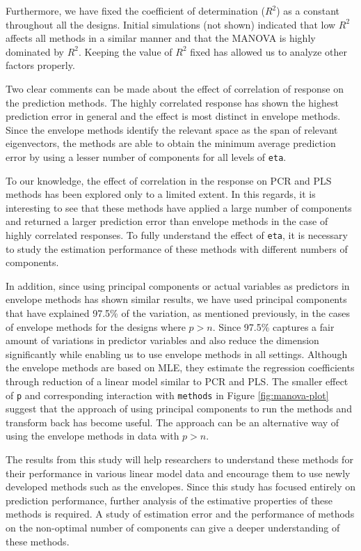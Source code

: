 \documentclass[review]{elsarticle}
\begin{document}
Furthermore, we have fixed the coefficient of determination (\(R^2\)) as a constant throughout all the designs. Initial simulations (not shown) indicated that low \(R^2\) affects all methods in a similar manner and that the MANOVA is highly dominated by \(R^2\). Keeping the value of \(R^2\) fixed has allowed us to analyze other factors properly.

Two clear comments can be made about the effect of correlation of response on the prediction methods. The highly correlated response has shown the highest prediction error in general and the effect is most distinct in envelope methods. Since the envelope methods identify the relevant space as the span of relevant eigenvectors, the methods are able to obtain the minimum average prediction error by using a lesser number of components for all levels of \texttt{eta}.

To our knowledge, the effect of correlation in the response on PCR and PLS methods has been explored only to a limited extent. In this regards, it is interesting to see that these methods have applied a large number of components and returned a larger prediction error than envelope methods in the case of highly correlated responses. To fully understand the effect of \texttt{eta}, it is necessary to study the estimation performance of these methods with different numbers of components.

In addition, since using principal components or actual variables as predictors in envelope methods has shown similar results, we have used principal components that have explained 97.5\% of the variation, as mentioned previously, in the cases of envelope methods for the designs where \(p>n\). Since 97.5\% captures a fair amount of variations in predictor variables and also reduce the dimension significantly while enabling us to use envelope methods in all settings. Although the envelope methods are based on MLE, they estimate the regression coefficients through reduction of a linear model similar to PCR and PLS. The smaller effect of \texttt{p} and corresponding interaction with \texttt{methods} in Figure \ref{fig:manova-plot} suggest that the approach of using principal components to run the methods and transform back has become useful. The approach can be an alternative way of using the envelope methods in data with \(p>n\).

The results from this study will help researchers to understand these methods for their performance in various linear model data and encourage them to use newly developed methods such as the envelopes. Since this study has focused entirely on prediction performance, further analysis of the estimative properties of these methods is required. A study of estimation error and the performance of methods on the non-optimal number of components can give a deeper understanding of these methods.
\end{document}
